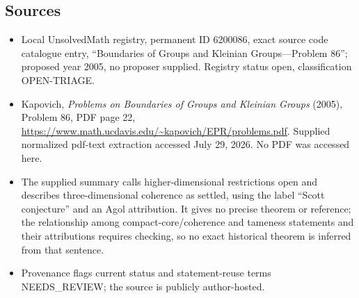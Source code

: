 \documentclass[11pt]{article}
\begin{document}
\subsection{Sources}
\begin{itemize}
\item Local UnsolvedMath registry, permanent ID 6200086, exact source code catalogue entry, ``Boundaries of Groups and Kleinian Groups---Problem 86''; proposed year 2005, no proposer supplied. Registry status open, classification OPEN-TRIAGE.
\item Kapovich, \emph{Problems on Boundaries of Groups and Kleinian Groups} (2005), Problem 86, PDF page 22, \url{https://www.math.ucdavis.edu/~kapovich/EPR/problems.pdf}. Supplied normalized pdf-text extraction accessed July 29, 2026. No PDF was accessed here.
\item The supplied summary calls higher-dimensional restrictions open and describes three-dimensional coherence as settled, using the label ``Scott conjecture'' and an Agol attribution. It gives no precise theorem or reference; the relationship among compact-core/coherence and tameness statements and their attributions requires checking, so no exact historical theorem is inferred from that sentence.
\item Provenance flags current status and statement-reuse terms NEEDS\_REVIEW; the source is publicly author-hosted.
\end{itemize}
\end{document}
